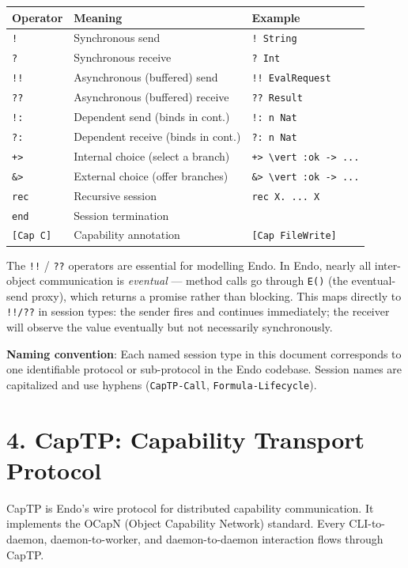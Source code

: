 \documentclass[11pt]{article}
\begin{document}
\begin{center}
\begin{tabular}{lll}
Operator & Meaning & Example\\
\hline
\texttt{!} & Synchronous send & \texttt{! String}\\
\texttt{?} & Synchronous receive & \texttt{? Int}\\
\texttt{!!} & Asynchronous (buffered) send & \texttt{!! EvalRequest}\\
\texttt{??} & Asynchronous (buffered) receive & \texttt{?? Result}\\
\texttt{!:} & Dependent send (binds in cont.) & \texttt{!: n Nat}\\
\texttt{?:} & Dependent receive (binds in cont.) & \texttt{?: n Nat}\\
\texttt{+>} & Internal choice (select a branch) & \texttt{+> \textbackslash{}vert :ok -> ...}\\
\texttt{\&>} & External choice (offer branches) & \texttt{\&> \textbackslash{}vert :ok -> ...}\\
\texttt{rec} & Recursive session & \texttt{rec X. ... X}\\
\texttt{end} & Session termination & \\
\texttt{[Cap C]} & Capability annotation & \texttt{[Cap FileWrite]}\\
\end{tabular}
\end{center}

The \texttt{!!} / \texttt{??} operators are essential for modelling Endo. In Endo, nearly
all inter-object communication is \emph{eventual} --- method calls go through
\texttt{E()} (the eventual-send proxy), which returns a promise rather than
blocking. This maps directly to \texttt{!!/??} in session types: the sender fires
and continues immediately; the receiver will observe the value eventually
but not necessarily synchronously.

\textbf{Naming convention}: Each named session type in this document corresponds to
one identifiable protocol or sub-protocol in the Endo codebase. Session
names are capitalized and use hyphens (\texttt{CapTP-Call}, \texttt{Formula-Lifecycle}).
\section{4. CapTP: Capability Transport Protocol}
\label{sec:orgd9c0525}

CapTP is Endo's wire protocol for distributed capability communication. It
implements the OCapN (Object Capability Network) standard. Every CLI-to-daemon,
daemon-to-worker, and daemon-to-daemon interaction flows through CapTP.
\end{document}
